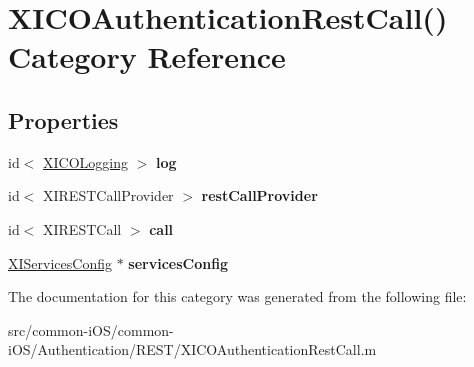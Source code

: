 \hypertarget{category_x_i_c_o_authentication_rest_call_07_08}{}\section{X\+I\+C\+O\+Authentication\+Rest\+Call() Category Reference}
\label{category_x_i_c_o_authentication_rest_call_07_08}
\subsection*{Properties}
\begin{DoxyCompactItemize}
\item 
\hypertarget{category_x_i_c_o_authentication_rest_call_07_08_ac68c2af9b8f78b7090061901c38c3d71}{}\label{category_x_i_c_o_authentication_rest_call_07_08_ac68c2af9b8f78b7090061901c38c3d71} 
id$<$ \hyperlink{protocol_x_i_c_o_logging-p}{X\+I\+C\+O\+Logging} $>$ {\bfseries log}
\item 
\hypertarget{category_x_i_c_o_authentication_rest_call_07_08_ab6355387346d91cc0719b9646e983166}{}\label{category_x_i_c_o_authentication_rest_call_07_08_ab6355387346d91cc0719b9646e983166} 
id$<$ X\+I\+R\+E\+S\+T\+Call\+Provider $>$ {\bfseries rest\+Call\+Provider}
\item 
\hypertarget{category_x_i_c_o_authentication_rest_call_07_08_aee466de4a71c4e0ce75c0aed87982dd1}{}\label{category_x_i_c_o_authentication_rest_call_07_08_aee466de4a71c4e0ce75c0aed87982dd1} 
id$<$ X\+I\+R\+E\+S\+T\+Call $>$ {\bfseries call}
\item 
\hypertarget{category_x_i_c_o_authentication_rest_call_07_08_a67820f19e738d5aee3e0f80ef1c1a2a8}{}\label{category_x_i_c_o_authentication_rest_call_07_08_a67820f19e738d5aee3e0f80ef1c1a2a8} 
\hyperlink{interface_x_i_services_config}{X\+I\+Services\+Config} $\ast$ {\bfseries services\+Config}
\end{DoxyCompactItemize}


The documentation for this category was generated from the following file\+:\begin{DoxyCompactItemize}
\item 
src/common-\/i\+O\+S/common-\/i\+O\+S/\+Authentication/\+R\+E\+S\+T/X\+I\+C\+O\+Authentication\+Rest\+Call.\+m\end{DoxyCompactItemize}
